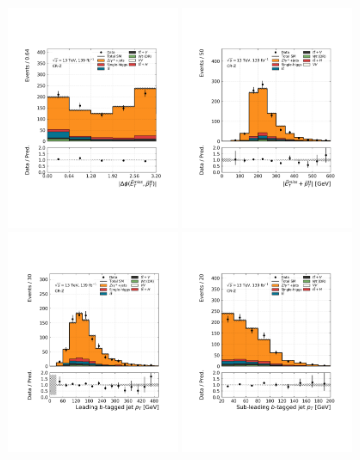\begin{figure}[!htb]
    \centering
    \includegraphics[width=0.4\textwidth]{figures/search_hh/bkg_estimate/crvr/crzhf/crztest_dphi_met_ll}
    \includegraphics[width=0.4\textwidth]{figures/search_hh/bkg_estimate/crvr/crzhf/crztest_met_pTll}
    \includegraphics[width=0.4\textwidth]{figures/search_hh/bkg_estimate/crvr/crzhf/crztest_bj0_pt}
    \includegraphics[width=0.4\textwidth]{figures/search_hh/bkg_estimate/crvr/crzhf/crztest_bj1_pt}

\end{figure}
